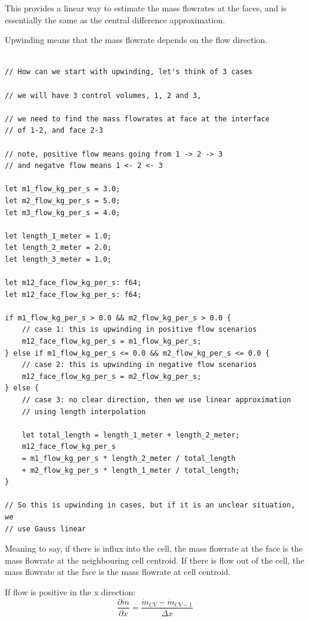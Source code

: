 \documentclass[masters]{ucbthesis}
\renewcommand{\_}{\kern-1.5pt\textunderscore\kern-1.5pt}
\begin{document}
This provides a linear way to estimate the mass flowrates at the faces, 
and is essentially the same as the central difference approximation.

Upwinding means that the mass flowrate depends on the flow direction.

\begin{lstlisting}

// How can we start with upwinding, let's think of 3 cases 

// we will have 3 control volumes, 1, 2 and 3,

// we need to find the mass flowrates at face at the interface 
// of 1-2, and face 2-3

// note, positive flow means going from 1 -> 2 -> 3 
// and negatve flow means 1 <- 2 <- 3

let m1_flow_kg_per_s = 3.0;
let m2_flow_kg_per_s = 5.0;
let m3_flow_kg_per_s = 4.0;

let length_1_meter = 1.0;
let length_2_meter = 2.0;
let length_3_meter = 1.0;

let m12_face_flow_kg_per_s: f64;
let m12_face_flow_kg_per_s: f64;

if m1_flow_kg_per_s > 0.0 && m2_flow_kg_per_s > 0.0 {
	// case 1: this is upwinding in positive flow scenarios
	m12_face_flow_kg_per_s = m1_flow_kg_per_s;
} else if m1_flow_kg_per_s <= 0.0 && m2_flow_kg_per_s <= 0.0 {
	// case 2: this is upwinding in negative flow scenarios
	m12_face_flow_kg_per_s = m2_flow_kg_per_s;
} else {
	// case 3: no clear direction, then we use linear approximation 
	// using length interpolation

	let total_length = length_1_meter + length_2_meter;
	m12_face_flow_kg_per_s 
	= m1_flow_kg_per_s * length_2_meter / total_length
	+ m2_flow_kg_per_s * length_1_meter / total_length;
}

// So this is upwinding in cases, but if it is an unclear situation, we 
// use Gauss linear

\end{lstlisting}

Meaning to say, if there is influx into the cell, the mass flowrate at 
the face is the mass flowrate at the neighbouring cell centroid. If 
there is flow out of the cell, the mass flowrate at the face is the mass 
flowrate at cell centroid.

If flow is positive in the x direction:
\begin{equation*}
	\frac{\partial \dot{m}}{\partial x}  
	= \frac{\dot{m}_{CV} - \dot{m}_{CV-1}}{\Delta x}  
\end{equation*}
\end{document}
